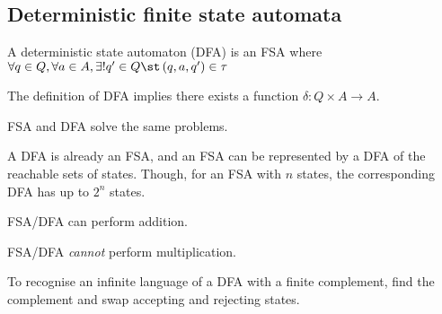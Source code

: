 \documentclass{article}
\begin{document}
\subsection{Deterministic finite state automata}
\begin{definition}
    A deterministic state automaton (DFA) is an FSA where
    \(
        \forall q \in Q, \forall a \in A,
        \exists! q' \in Q \st \left(q,a,q'\right)\in\tau
    \)
\end{definition}
\begin{theorem}
    The definition of DFA implies there exists a function \(\delta: Q \times A \to A\).
\end{theorem}
\begin{theorem}
    FSA and DFA solve the same problems.
    
    A DFA is already an FSA,
    and an FSA can be represented by a DFA of the reachable sets of states.
    Though, for an FSA with \(n\) states,
    the corresponding DFA has up to \(2^n\) states.
\end{theorem}
\begin{theorem}
    FSA/DFA can perform addition.
\end{theorem}
\begin{theorem}
    FSA/DFA \emph{cannot} perform multiplication.
\end{theorem}
\begin{theorem}
    To recognise an infinite language of a DFA with a finite complement,
    find the complement and swap accepting and rejecting states.
\end{theorem}

\newpage
\end{document}
